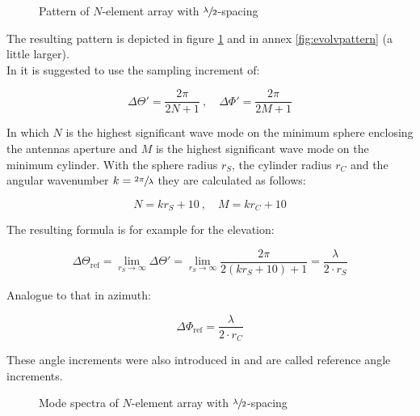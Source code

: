 \begin{figure}
  \centering
  \centering
  \centering
\caption{Pattern of $N$-element array with $\sfrac{\lambda}{2}$-spacing}
\label{fig:evolvpattern2}
\end{figure}

The resulting pattern is depicted in figure \ref{fig:evolvpattern2} and in annex \ref{fig:evolvpattern} (a little larger).\\
In \cite{hansen} it is suggested to use the sampling increment of:

\begin{equation}
\Delta\Theta' = \frac{2\pi}{2N+1}\ , \quad \Delta\Phi'=\frac{2\pi}{2M+1}
\end{equation}

In which $N$ is the highest significant wave mode on the minimum sphere enclosing the antennas aperture and $M$ is the highest significant wave mode on the minimum cylinder. With the sphere radius $r_S$, the cylinder radius $r_C$ and the angular wavenumber $k = \sfrac{2\pi}{\lambda}$ they are calculated as follows:

\begin{equation}
N = kr_S+10\ , \quad M = kr_C+10
\end{equation}

The resulting formula is for example for the elevation:

\begin{equation}
\Delta\Theta_{\text{ref}} = \lim_{r_S \to \infty}\Delta\Theta' = \lim_{r_S \to \infty} \frac{2\pi}{2\left(kr_S+10\right)+1} = \frac{\lambda}{2\cdot r_S}
\end{equation}

Analogue to that in azimuth:

\begin{equation}
\Delta\Phi_{\text{ref}} = \frac{\lambda}{2\cdot r_C}
\end{equation}

These angle increments were also introduced in \cite{2018arXiv180310993F} and are called reference angle increments.

\begin{figure}
  \centering
  \centering
  \centering
\caption{Mode spectra of $N$-element array with $\sfrac{\lambda}{2}$-spacing}
\label{fig:evolvpattern3}
\end{figure}

